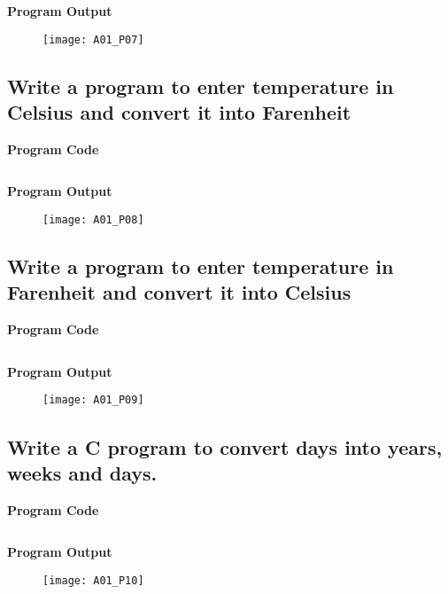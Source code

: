 \inputminted{C}{programs/A01_P07.c}

\textbf{Program Output}

\begin{figure}[h]
  \texttt{[image: A01\_P07]}
\end{figure}

\newpage



\subsection{Write a program to enter temperature in Celsius and convert it into Farenheit}
\textbf{Program Code}

\inputminted{C}{programs/A01_P08.c}

\textbf{Program Output}

\begin{figure}[h]
  \texttt{[image: A01\_P08]}
\end{figure}

\newpage



\subsection{Write a program to enter temperature in Farenheit and convert it into Celsius}
\textbf{Program Code}

\inputminted{C}{programs/A01_P09.c}

\textbf{Program Output}

\begin{figure}[h]
  \texttt{[image: A01\_P09]}
\end{figure}

\newpage



\subsection{Write a C program to convert days into years, weeks and days.}
\textbf{Program Code}

\inputminted{C}{programs/A01_P10.c}

\textbf{Program Output}

\begin{figure}[h]
  \texttt{[image: A01\_P10]}
\end{figure}

